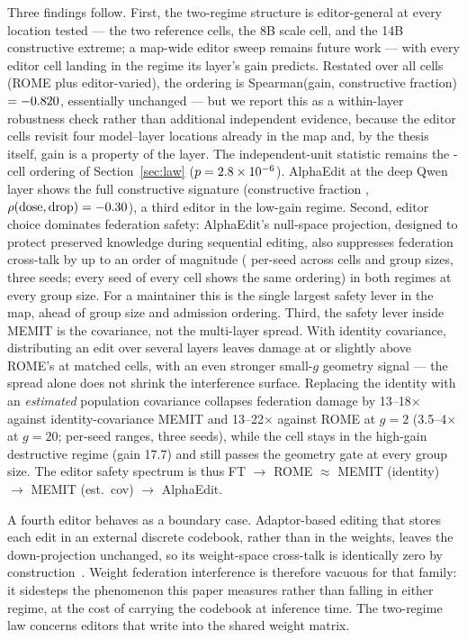 \documentclass[preprint,12pt]{elsarticle}
\begin{document}
Three findings follow. First, the two-regime structure is editor-general at every
location tested --- the two reference cells, the 8B scale cell, and the 14B
constructive extreme; a map-wide editor sweep remains future work --- with every
editor cell landing in the regime its layer's gain predicts. Restated over all \nCellsCombined{} cells
(ROME plus editor-varied), the ordering is Spearman(gain, constructive fraction)
$=-0.820{}$, essentially unchanged --- but we report this as a within-layer
robustness check rather than additional independent evidence, because the editor cells
revisit four model--layer locations already in the map and, by the thesis itself, gain is
a property of the layer. The independent-unit statistic remains the \nCells{}-cell
ordering of Section~\ref{sec:law} ($p=2.8\times10^{-6}{}$).
AlphaEdit at the deep Qwen layer shows the full constructive signature (constructive
fraction \alphaEditConstrFrac{}, $\rho(\mathrm{dose},\mathrm{drop})=-0.30{}$), a
third editor in the low-gain regime. Second, editor choice dominates federation safety:
AlphaEdit's null-space projection, designed to protect preserved knowledge during sequential
editing, also suppresses federation cross-talk by up to an order of magnitude
(\alphaSuppressRange{} per-seed across cells and group sizes, three seeds; every seed
of every cell shows the same ordering) in both regimes at every group size. For a maintainer this is the
single largest safety lever in the map, ahead of group size and admission ordering. Third,
the safety lever inside MEMIT is the covariance, not the multi-layer spread. With
identity covariance, distributing an edit over several layers leaves damage at or
slightly above ROME's at matched cells, with an even stronger small-$g$ geometry
signal --- the spread alone does not shrink the interference surface. Replacing the
identity with an \emph{estimated} population covariance collapses federation damage
by 13--18$\times$ against identity-covariance MEMIT and 13--22$\times$ against ROME at
$g{=}2$ (3.5--4$\times$ at $g{=}20$; per-seed ranges, three seeds), while the cell
stays in the high-gain destructive regime (gain 17.7) and still passes the geometry
gate at every group size. The editor safety spectrum is thus FT $\to$ ROME $\approx$
MEMIT (identity) $\to$ MEMIT (est.\ cov) $\to$ AlphaEdit.

A fourth editor behaves as a boundary case. Adaptor-based editing that stores each edit in an
external discrete codebook, rather than in the weights, leaves the down-projection unchanged,
so its weight-space cross-talk is identically zero by construction~\cite{grace2023}. Weight
federation interference is therefore vacuous for that family: it sidesteps the phenomenon
this paper measures rather than falling in either regime, at the cost of carrying the
codebook at inference time. The two-regime law concerns editors that write into the shared
weight matrix.
\end{document}
